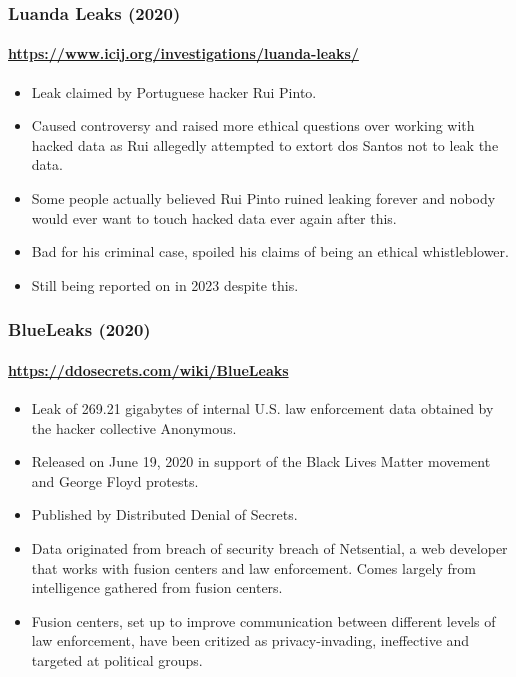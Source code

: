 \documentclass[aspectratio=169,usenames,dvipsnames]{beamer}
\begin{document}
\begin{frame}
  \frametitle{Luanda Leaks (2020)}
  \framesubtitle{\url{https://www.icij.org/investigations/luanda-leaks/}}

  \begin{itemize}[<+->]
    \item Leak claimed by Portuguese hacker Rui Pinto.
    \item Caused controversy and raised more ethical questions over working
      with hacked data as Rui allegedly attempted to extort dos Santos not to
      leak the data.
    \item Some people actually believed Rui Pinto ruined leaking forever and
      nobody would ever want to touch hacked data ever again after this.
    \item Bad for his criminal case, spoiled his claims of being an ethical
      whistleblower.
    \item Still being reported on in 2023 despite this.
  \end{itemize}

\end{frame}
\begin{frame}
  \frametitle{BlueLeaks (2020)}
  \framesubtitle{\url{https://ddosecrets.com/wiki/BlueLeaks}}

  \begin{itemize}[<+->]
    \item Leak of 269.21 gigabytes of internal U.S. law enforcement data
      obtained by the hacker collective Anonymous.
    \item Released on June 19, 2020 in support of the Black Lives Matter
      movement and George Floyd protests.
    \item Published by Distributed Denial of Secrets.
    \item Data originated from breach of security breach of Netsential, a
      web developer that works with fusion centers and law enforcement. Comes
      largely from intelligence gathered from fusion centers.
    \item Fusion centers, set up to improve communication between different
      levels of law enforcement, have been critized as privacy-invading,
      ineffective and targeted at political groups.
  \end{itemize}

\end{frame}
\end{document}
